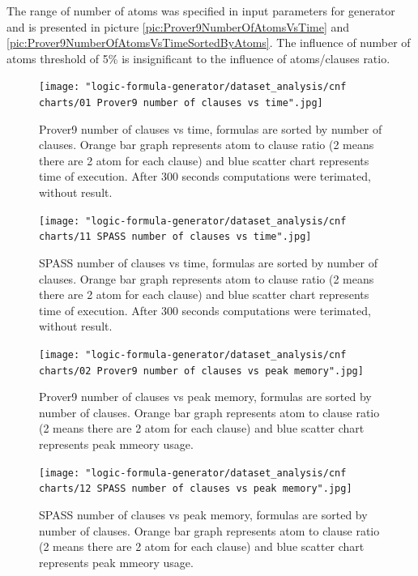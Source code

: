 The range of number of atoms was specified in input parameters for generator and is presented in picture \ref{pic:Prover9NumberOfAtomsVsTime} and \ref{pic:Prover9NumberOfAtomsVsTimeSortedByAtoms}. The influence of number of atoms threshold of 5\% is insignificant to the influence of atoms/clauses ratio.

\begin{figure}[h]
  \centering
  \texttt{[image: "logic-formula-generator/dataset\_analysis/cnf charts/01 Prover9 number of clauses vs time".jpg]}
  \caption{Prover9 number of clauses vs time, formulas are sorted by number of clauses. Orange bar graph represents atom to clause ratio (2 means there are 2 atom for each clause) and blue scatter chart represents time of execution. After 300 seconds computations were terimated, without result.}
  \label{pic:Prover9NumberOfClausesVsTime}
\end{figure}

\begin{figure}[h]
  \centering
  \texttt{[image: "logic-formula-generator/dataset\_analysis/cnf charts/11 SPASS number of clauses vs time".jpg]}
  \caption{SPASS number of clauses vs time, formulas are sorted by number of clauses. Orange bar graph represents atom to clause ratio (2 means there are 2 atom for each clause) and blue scatter chart represents time of execution. After 300 seconds computations were terimated, without result.}
  \label{pic:SPASSNumberOfClausesVsTime}
\end{figure}

\begin{figure}[h]
  \centering
  \texttt{[image: "logic-formula-generator/dataset\_analysis/cnf charts/02 Prover9 number of clauses vs peak memory".jpg]}
  \caption{Prover9 number of clauses vs peak memory, formulas are sorted by number of clauses. Orange bar graph represents atom to clause ratio (2 means there are 2 atom for each clause) and blue scatter chart represents peak mmeory usage.}
  \label{pic:Prover9NumberOfClausesVsMemory}
\end{figure}

\begin{figure}[h]
  \centering
  \texttt{[image: "logic-formula-generator/dataset\_analysis/cnf charts/12 SPASS number of clauses vs peak memory".jpg]}
  \caption{SPASS number of clauses vs peak memory, formulas are sorted by number of clauses. Orange bar graph represents atom to clause ratio (2 means there are 2 atom for each clause) and blue scatter chart represents peak mmeory usage.}
  \label{pic:SPASSNumberOfClausesVsMemory}
\end{figure}

